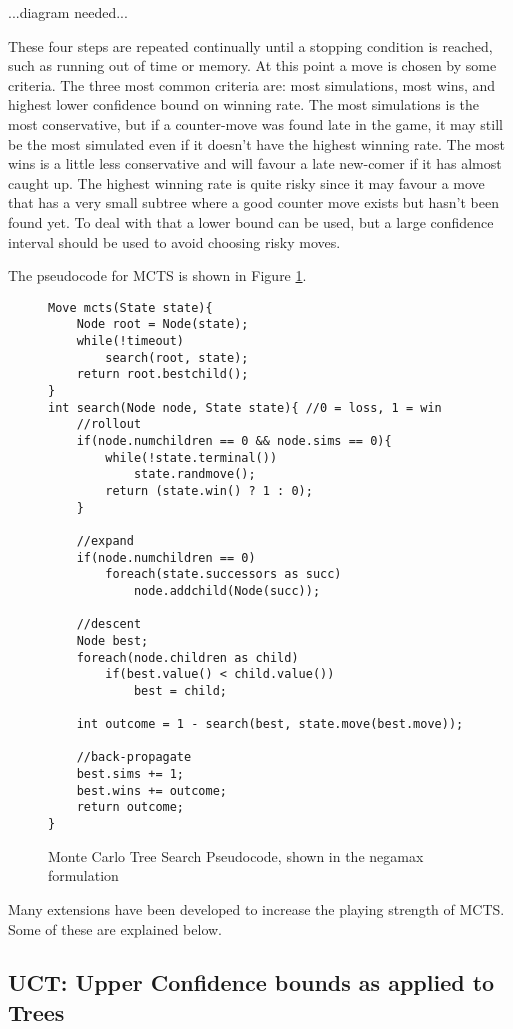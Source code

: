 ...diagram needed...

These four steps are repeated continually until a stopping condition is reached, such as running out of time or memory. At this point a move is chosen by some criteria. The three most common criteria are: most simulations, most wins, and highest lower confidence bound on winning rate. The most simulations is the most conservative, but if a counter-move was found late in the game, it may still be the most simulated even if it doesn't have the highest winning rate. The most wins is a little less conservative and will favour a late new-comer if it has almost caught up. The highest winning rate is quite risky since it may favour a move that has a very small subtree where a good counter move exists but hasn't been found yet. To deal with that a lower bound can be used, but a large confidence interval should be used to avoid choosing risky moves.

The pseudocode for MCTS is shown in Figure \ref{fig:mctscode}.

\begin{figure}

\begin{lstlisting}
Move mcts(State state){
	Node root = Node(state);
	while(!timeout)
		search(root, state);
	return root.bestchild();
}
int search(Node node, State state){ //0 = loss, 1 = win
	//rollout
	if(node.numchildren == 0 && node.sims == 0){
		while(!state.terminal())
			state.randmove();
		return (state.win() ? 1 : 0);
	}

	//expand
	if(node.numchildren == 0)
		foreach(state.successors as succ)
			node.addchild(Node(succ));

	//descent
	Node best;
	foreach(node.children as child)
		if(best.value() < child.value())
			best = child;

	int outcome = 1 - search(best, state.move(best.move));

	//back-propagate
	best.sims += 1;
	best.wins += outcome;
	return outcome;
}
\end{lstlisting}

\caption{Monte Carlo Tree Search Pseudocode, shown in the negamax formulation}
\label{fig:mctscode}
\end{figure}


Many extensions have been developed to increase the playing strength of MCTS. Some of these are explained below.

\subsection{UCT: Upper Confidence bounds as applied to Trees}\label{sec:uct}

